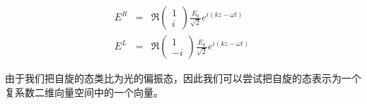 \begin{enumerate}
\begin{align}
E^{R} & = & \Re \left( \begin{array}{ccc} 1 \\ i  \end{array} \right)  \frac{ E_0 }{ \sqrt{2} }   e^{i ( kz - \omega t  )}~ \\
E^{L} & = & \Re \left( \begin{array}{ccc} 1 \\  -i  \end{array} \right)  \frac{E_0}{ \sqrt{2} }  e^{i ( kz - \omega t  ) }~  
\end{align}
\end{enumerate}

由于我们把自旋的态类比为光的偏振态，因此我们可以尝试把自旋的态表示为一个复系数二维向量空间中的一个向量。

